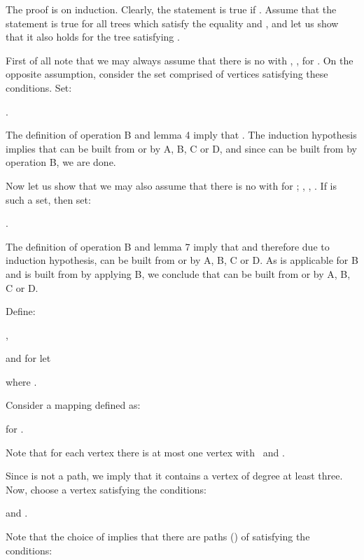 \documentclass{article}
\begin{document}
The proof is on induction. Clearly, the statement is true if . Assume that the statement is true for all trees  which satisfy the equality  and , and let us show that it also holds for the tree 
satisfying .

First of all note that we may always assume that there is no  with , ,  for . On the
opposite assumption, consider the set  comprised of vertices  satisfying these conditions. Set:

\begin{center}
.
\end{center}

The definition of operation B and lemma 4 imply that . The induction hypothesis implies that 
can be built from  or  by A, B, C or D, and since  can be
built from  by operation B, we are done.

Now let us show that we may also assume that there is no  with  for ; , , . If  is
such a set, then set:

\begin{center}
.
\end{center}

The definition of operation B and lemma 7 imply that  and therefore due to induction hypothesis,  can be built from  or  by A, B, C or D. As  is applicable for B and  is
built from  by applying B, we conclude that  can be built
from  or  by A, B, C or D.

Define:

\begin{center}
,
\end{center}

and for  let

\begin{center}
 where .
\end{center}

Consider a mapping  defined as:

\begin{center}
for  .
\end{center}

Note that for each vertex  there is at most one vertex  with 
\ and .

Since  is not a path, we imply that it contains a vertex of degree at
least three. Now, choose a vertex  satisfying the conditions:

\begin{center}
 and .
\end{center}

Note that the choice of  implies that there are paths  () of  satisfying the conditions:
\end{document}
